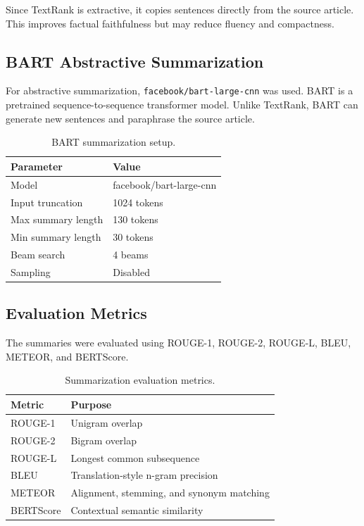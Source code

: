 \documentclass[11pt,a4paper]{article}
\begin{document}
Since TextRank is extractive, it copies sentences directly from the source article. This improves factual faithfulness but may reduce fluency and compactness.

\subsection{BART Abstractive Summarization}

For abstractive summarization, \texttt{facebook/bart-large-cnn} was used. BART is a pretrained sequence-to-sequence transformer model. Unlike TextRank, BART can generate new sentences and paraphrase the source article.

\begin{table}[H]
\centering
\caption{BART summarization setup.}
\begin{tabular}{ll}
\toprule
Parameter & Value \\
\midrule
Model & facebook/bart-large-cnn \\
Input truncation & 1024 tokens \\
Max summary length & 130 tokens \\
Min summary length & 30 tokens \\
Beam search & 4 beams \\
Sampling & Disabled \\
\bottomrule
\end{tabular}
\end{table}

\subsection{Evaluation Metrics}

The summaries were evaluated using ROUGE-1, ROUGE-2, ROUGE-L, BLEU, METEOR, and BERTScore.

\begin{table}[H]
\centering
\caption{Summarization evaluation metrics.}
\begin{tabular}{ll}
\toprule
Metric & Purpose \\
\midrule
ROUGE-1 & Unigram overlap \\
ROUGE-2 & Bigram overlap \\
ROUGE-L & Longest common subsequence \\
BLEU & Translation-style n-gram precision \\
METEOR & Alignment, stemming, and synonym matching \\
BERTScore & Contextual semantic similarity \\
\bottomrule
\end{tabular}
\end{table}
\end{document}

